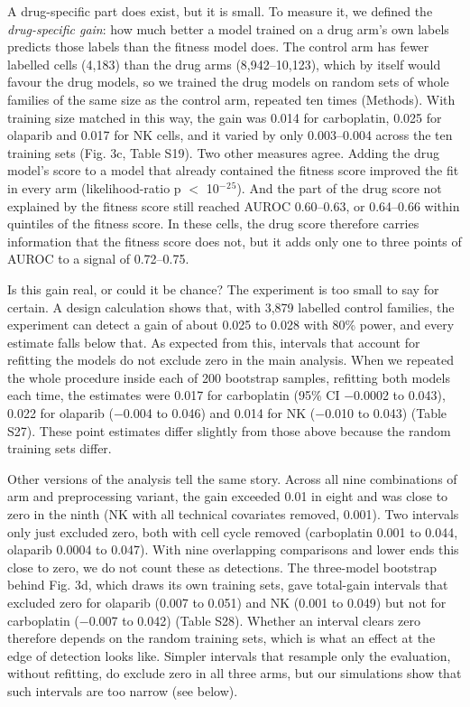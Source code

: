 \documentclass[11pt,a4paper]{article}
\begin{document}
A drug-specific part does exist, but it is small. To measure it, we defined the \emph{drug-specific gain}: how much better a model trained on a drug arm's own labels predicts those labels than the fitness model does. The control arm has fewer labelled cells (4,183) than the drug arms (8,942--10,123), which by itself would favour the drug models, so we trained the drug models on random sets of whole families of the same size as the control arm, repeated ten times (Methods). With training size matched in this way, the gain was 0.014 for carboplatin, 0.025 for olaparib and 0.017 for NK cells, and it varied by only 0.003--0.004 across the ten training sets (Fig. 3c, Table S19). Two other measures agree. Adding the drug model's score to a model that already contained the fitness score improved the fit in every arm (likelihood-ratio p $<$ 10$^-$$^2$$^5$). And the part of the drug score not explained by the fitness score still reached AUROC 0.60--0.63, or 0.64--0.66 within quintiles of the fitness score. In these cells, the drug score therefore carries information that the fitness score does not, but it adds only one to three points of AUROC to a signal of 0.72--0.75.

Is this gain real, or could it be chance? The experiment is too small to say for certain. A design calculation shows that, with 3,879 labelled control families, the experiment can detect a gain of about 0.025 to 0.028 with 80\% power, and every estimate falls below that. As expected from this, intervals that account for refitting the models do not exclude zero in the main analysis. When we repeated the whole procedure inside each of 200 bootstrap samples, refitting both models each time, the estimates were 0.017 for carboplatin (95\% CI $-$0.0002 to 0.043), 0.022 for olaparib ($-$0.004 to 0.046) and 0.014 for NK ($-$0.010 to 0.043) (Table S27). These point estimates differ slightly from those above because the random training sets differ.

Other versions of the analysis tell the same story. Across all nine combinations of arm and preprocessing variant, the gain exceeded 0.01 in eight and was close to zero in the ninth (NK with all technical covariates removed, 0.001). Two intervals only just excluded zero, both with cell cycle removed (carboplatin 0.001 to 0.044, olaparib 0.0004 to 0.047). With nine overlapping comparisons and lower ends this close to zero, we do not count these as detections. The three-model bootstrap behind Fig. 3d, which draws its own training sets, gave total-gain intervals that excluded zero for olaparib (0.007 to 0.051) and NK (0.001 to 0.049) but not for carboplatin ($-$0.007 to 0.042) (Table S28). Whether an interval clears zero therefore depends on the random training sets, which is what an effect at the edge of detection looks like. Simpler intervals that resample only the evaluation, without refitting, do exclude zero in all three arms, but our simulations show that such intervals are too narrow (see below).
\end{document}
